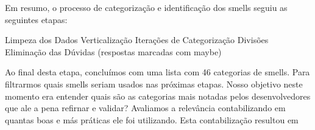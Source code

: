 Em resumo, o processo de categoriza\c{c}\~ao e identifica\c{c}\~ao dos smells seguiu as seguintes etapas:

Limpeza dos Dados \textrightarrow Verticaliza\c{c}\~ao \textrightarrow Itera\c{c}\~oes de Categoriza\c{c}\~ao \textrightarrow Divis\~oes \textrightarrow Elimina\c{c}\~ao das D\'uvidas (respostas marcadas com maybe)

Ao final desta etapa, conclu\'imos com uma lista com 46 categorias de smells. Para filtrarmos quais smells seriam usados nas pr\'oximas etapas. Nosso objetivo neste momento era entender quais s\~ao as categorias mais notadas pelos desenvolvedores que ale a pena refirnar e validar? Avaliamos a relev\^ancia contabilizando em quantas boas e m\'as pr\'aticas ele foi utilizando. Esta contabiliza\c{c}\~ao resultou em